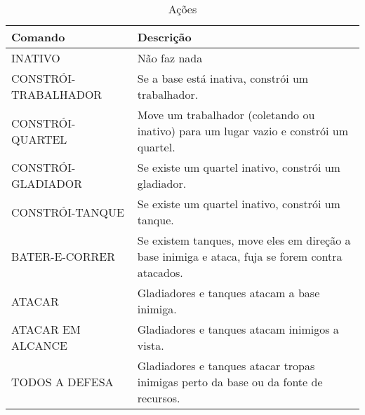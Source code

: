 \begin{table}
\begin{center}
\begin{tabular}{|l|p{8cm}|}
    \hline
    Comando              & Descrição                                                                                       \\
    \hline
    INATIVO              & Não faz nada                                                                                    \\
    \hline
    CONSTRÓI-TRABALHADOR & Se a base está inativa, constrói um trabalhador.                                                \\
    \hline
    CONSTRÓI-QUARTEL     & Move um trabalhador (coletando ou inativo) para um lugar vazio e constrói um quartel.           \\
    \hline
    CONSTRÓI-GLADIADOR   & Se existe um quartel inativo, constrói um gladiador.                                            \\
    \hline
    CONSTRÓI-TANQUE      & Se existe um quartel inativo, constrói um tanque.                                               \\
    \hline
    BATER-E-CORRER       & Se existem tanques, move eles em direção a base inimiga e ataca, fuja se forem contra atacados. \\
    \hline
    ATACAR               & Gladiadores e tanques atacam a base inimiga.                                                    \\
    \hline
    ATACAR EM ALCANCE    & Gladiadores e tanques atacam inimigos a vista.                                                  \\
    \hline
    TODOS A DEFESA       & Gladiadores e tanques atacar tropas inimigas perto da base ou da fonte de recursos.             \\
    \hline
\end{tabular}
\end{center}
\caption{Ações}
\label{tab:acoes}
\end{table}
